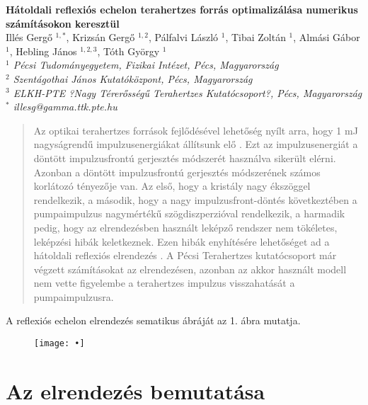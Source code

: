 \documentclass[12pt, a4paper]{article}
\begin{document}
\begin{center}
\LARGE\textbf{Hátoldali reflexiós echelon terahertzes forrás optimalizálása numerikus számításokon keresztül}\vspace*{0.7cm}\\\large
Illés Gergő $^{1,*}$, Krizsán Gergő $^{1,2}$, Pálfalvi László $^1$, Tibai Zoltán $^1$, Almási Gábor $^1$, Hebling János $^{1,2,3}$, Tóth György $^1$\vspace*{0.4cm}\\\normalsize
\textit{$^1$ Pécsi Tudományegyetem, Fizikai Intézet, Pécs, Magyarország\\
$^2$ Szentágothai János Kutatóközpont, Pécs, Magyarország\\
$^3$ ELKH-PTE ?Nagy Térerősségű Terahertzes Kutatócsoport?, Pécs, Magyarország\\
$^*$ illesg@gamma.ttk.pte.hu}
\end{center}\vspace*{0.5cm}
\begin{abstract}\noindent
Az optikai terahertzes források fejlődésével lehetőség nyílt arra, hogy 1 mJ nagyságrendű impulzusenergiákat állítsunk elő \cite{wu20201}. Ezt az impulzusenergiát a döntött impulzusfrontú gerjesztés módszerét \cite{hebling2002velocity} használva sikerült elérni. Azonban a döntött impulzusfrontú gerjesztés módszerének számos korlátozó tényezője van. Az első, hogy a kristály nagy ékszöggel rendelkezik, a második, hogy a nagy impulzusfront-döntés következtében a pumpaimpulzus nagymértékű szögdiszperzióval rendelkezik, a harmadik pedig, hogy az elrendezésben használt leképző rendszer nem tökéletes, leképzési hibák keletkeznek. Ezen hibák enyhítésére lehetőséget ad a hátoldali reflexiós elrendezés \cite{krizsan2020lithium,toth2019single}. A Pécsi Terahertzes kutatócsoport már végzett számításokat az elrendezésen, azonban az akkor használt modell nem vette figyelembe a terahertzes impulzus visszahatását a pumpaimpulzusra.
\end{abstract}
\onehalfspace
A reflexiós echelon elrendezés sematikus ábráját az 1. ábra mutatja.
\begin{figure}[H]
\centering
\texttt{[image: •]}
\end{figure}
\section{Az elrendezés bemutatása}
\singlespace
\printbibliography[title = Irodalomjegszék]
\end{document}
